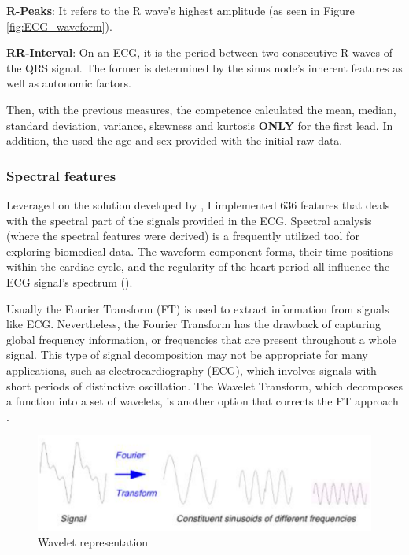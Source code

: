 \textbf{R-Peaks}: It refers to the R wave's highest amplitude (as seen in Figure \ref{fig:ECG_waveform}).

\textbf{RR-Interval}: On an ECG, it is the period between two consecutive R-waves of the QRS signal. The former is determined by the sinus node's inherent features as well as autonomic factors.

Then, with the previous measures, the competence calculated the mean, median, standard deviation, variance, skewness and kurtosis \textbf{ONLY} for the first lead. In addition, the used the age and sex provided with the initial raw data.

\subsubsection{Spectral features}

Leveraged on the solution developed by \cite{github_spectralfeatures}, I implemented 636 features that deals with the spectral part of the signals provided in the ECG. Spectral analysis (where the spectral features were derived) is a frequently utilized tool for exploring biomedical data. The waveform component forms, their time positions within the cardiac cycle, and the regularity of the heart period all influence the ECG signal's spectrum (\cite{spectralfeatures}). 

Usually the Fourier Transform (FT) is used to extract information from signals like ECG. Nevertheless, the Fourier Transform has the drawback of capturing global frequency information, or frequencies that are present throughout a whole signal. This type of signal decomposition may not be appropriate for many applications, such as electrocardiography (ECG), which involves signals with short periods of distinctive oscillation. The Wavelet Transform, which decomposes a function into a set of wavelets, is another option that corrects the FT approach \cite{spectral_features}.

\begin{figure}[H]
\centering
\includegraphics[scale=0.4]{img/wavelet.PNG}
\caption{Wavelet representation}
\label{fig:wavelet}
\end{figure}

